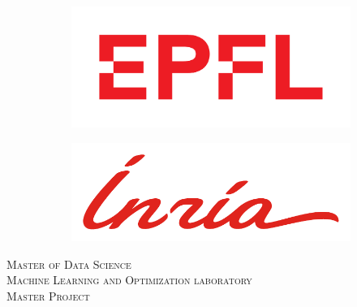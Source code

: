 
\begin{titlepage}
\begin{center}

\sffamily

\null\vspace{1cm}

\begin{figure}[H]
	\centering
	\begin{subfigure}{.5\textwidth}
		\centering
		\includegraphics[width=0.6\linewidth]{figures/epfl.pdf}
	\end{subfigure}%
	\begin{subfigure}{.5\textwidth}
		\centering
		\includegraphics[width=0.6\linewidth]{figures/inria_pms.pdf}
	\end{subfigure}
\end{figure}

\vspace{2cm}

\textsc{Master of Data Science}\\
\textsc{Machine Learning and Optimization laboratory}\\
\textsc{Master Project}\\

\vspace{2cm}


\end{center}
\end{titlepage}
